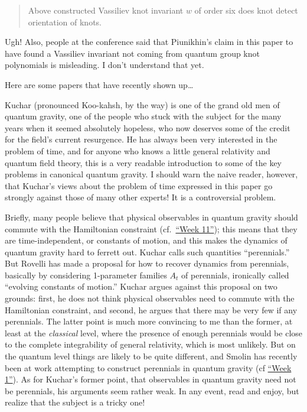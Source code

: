 \documentclass[12pt]{article}
\def\tightlist{}
\renewcommand{\texttt}[1]{%
  \begingroup
  \ttfamily
  \begingroup\lccode`~=`/\lowercase{\endgroup\def~}{/\discretionary{}{}{}}%
  \begingroup\lccode`~=`[\lowercase{\endgroup\def~}{[\discretionary{}{}{}}%
  \begingroup\lccode`~=`.\lowercase{\endgroup\def~}{.\discretionary{}{}{}}%
  \catcode`/=\active\catcode`[=\active\catcode`.=\active
  \scantokens{#1\noexpand}%
  \endgroup
}
\begin{document}
\begin{quote}
Above constructed Vassiliev knot invariant \(w\) of order six does knot
detect orientation of knots.
\end{quote}
\noindent
Ugh! Also, people at the conference said that Piunikhin's claim in this
paper to have found a Vassiliev invariant not coming from quantum group
knot polynomials is misleading. I don't understand that yet.

Here are some papers that have recently shown up\ldots{}

\noindent
Kuchar (pronounced Koo-kahsh, by the way) is one of the grand old men of
quantum gravity, one of the people who stuck with the subject for the
many years when it seemed absolutely hopeless, who now deserves some of
the credit for the field's current resurgence. He has always been very
interested in the problem of time, and for anyone who knows a little
general relativity and quantum field theory, this is a very readable
introduction to some of the key problems in canonical quantum gravity. I
should warn the naive reader, however, that Kuchar's views about the
problem of time expressed in this paper go strongly against those of
many other experts! It is a controversial problem.

Briefly, many people believe that physical observables in quantum
gravity should commute with the Hamiltonian constraint (cf.\
\protect\hyperlink{week11}{``Week 11''}); this means that they are
time-independent, or constants of motion, and this makes the dynamics of
quantum gravity hard to ferrett out. Kuchar calls such quantities
``perennials.'' But Rovelli has made a proposal for how to recover
dynamics from perennials, basically by considering 1-parameter families
\(A_t\) of perennials, ironically called ``evolving constants of
motion.'' Kuchar argues against this proposal on two grounds: first, he
does not think physical observables need to commute with the Hamiltonian
constraint, and second, he argues that there may be very few if any
perennials. The latter point is much more convincing to me than the
former, at least at the \emph{classical} level, where the presence of
enough perennials would be close to the complete integrability of
general relativity, which is most unlikely. But on the quantum level
things are likely to be quite different, and Smolin has recently been at
work attempting to construct perennials in quantum gravity (cf
\protect\hyperlink{week1}{``Week 1''}). As for Kuchar's former point,
that observables in quantum gravity need not be perennials, his
arguments seem rather weak. In any event, read and enjoy, but realize
that the subject is a tricky one!
\end{document}
